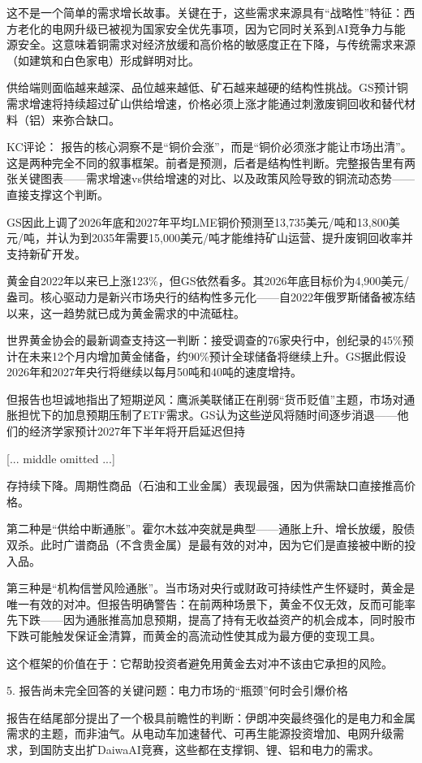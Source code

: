 \documentclass[11pt]{ctexart}
\begin{document}
这不是一个简单的需求增长故事。关键在于，这些需求来源具有“战略性”特征：西方老化的电网升级已被视为国家安全优先事项，因为它同时关系到AI竞争力与能源安全。这意味着铜需求对经济放缓和高价格的敏感度正在下降，与传统需求来源（如建筑和白色家电）形成鲜明对比。

供给端则面临越来越深、品位越来越低、矿石越来越硬的结构性挑战。GS预计铜需求增速将持续超过矿山供给增速，价格必须上涨才能通过刺激废铜回收和替代材料（铝）来弥合缺口。

KC评论： 报告的核心洞察不是“铜价会涨”，而是“铜价必须涨才能让市场出清”。这是两种完全不同的叙事框架。前者是预测，后者是结构性判断。完整报告里有两张关键图表——需求增速vs供给增速的对比、以及政策风险导致的铜流动态势——直接支撑这个判断。

GS因此上调了2026年底和2027年平均LME铜价预测至13,735美元/吨和13,800美元/吨，并认为到2035年需要15,000美元/吨才能维持矿山运营、提升废铜回收率并支持新矿开发。

黄金自2022年以来已上涨123\%，但GS依然看多。其2026年底目标价为4,900美元/盎司。核心驱动力是新兴市场央行的结构性多元化——自2022年俄罗斯储备被冻结以来，这一趋势就已成为黄金需求的中流砥柱。

世界黄金协会的最新调查支持这一判断：接受调查的76家央行中，创纪录的45\%预计在未来12个月内增加黄金储备，约90\%预计全球储备将继续上升。GS据此假设2026年和2027年央行将继续以每月50吨和40吨的速度增持。

但报告也坦诚地指出了短期逆风：鹰派美联储正在削弱“货币贬值”主题，市场对通胀担忧下的加息预期压制了ETF需求。GS认为这些逆风将随时间逐步消退——他们的经济学家预计2027年下半年将开启延迟但持

[... middle omitted ...]

存持续下降。周期性商品（石油和工业金属）表现最强，因为供需缺口直接推高价格。

第二种是“供给中断通胀”。霍尔木兹冲突就是典型——通胀上升、增长放缓，股债双杀。此时广谱商品（不含贵金属）是最有效的对冲，因为它们是直接被中断的投入品。

第三种是“机构信誉风险通胀”。当市场对央行或财政可持续性产生怀疑时，黄金是唯一有效的对冲。但报告明确警告：在前两种场景下，黄金不仅无效，反而可能率先下跌——因为通胀推高加息预期，提高了持有无收益资产的机会成本，同时股市下跌可能触发保证金清算，而黄金的高流动性使其成为最方便的变现工具。

这个框架的价值在于：它帮助投资者避免用黄金去对冲不该由它承担的风险。

5. 报告尚未完全回答的关键问题：电力市场的“瓶颈”何时会引爆价格

报告在结尾部分提出了一个极具前瞻性的判断：伊朗冲突最终强化的是电力和金属需求的主题，而非油气。从电动车加速替代、可再生能源投资增加、电网升级需求，到国防支出扩DaiwaAI竞赛，这些都在支撑铜、锂、铝和电力的需求。
\end{document}
